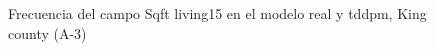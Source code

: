 \begin{figure}[H]
    \centering
    
    \caption{Frecuencia del campo Sqft living15 en el modelo real y tddpm, King county (A-3)}
    \label{frecuency-tddpm-sqft living15}
\end{figure}